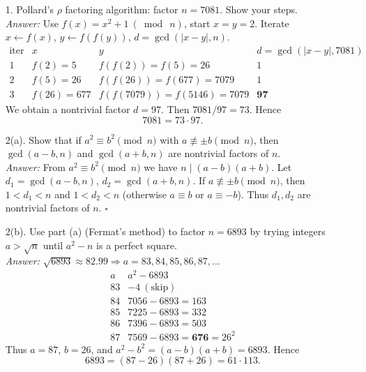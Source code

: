 \documentclass{article}
\begin{document}
\begin{itemize}
    \item[1.] Pollard’s $\rho$ factoring algorithm: factor \(n=7081\). Show your steps.
    \medskip\\
    \textit{Answer:} Use \(f(x)=x^2+1\ (\bmod\ n)\), start \(x=y=2\). Iterate \(x\gets f(x)\), \(y\gets f(f(y))\), \(d=\gcd(|x-y|,n)\).
    \[
    \begin{array}{c|c|c|c}
      \text{iter} & x & y & d=\gcd(|x-y|,7081)\\ \hline
      1 & f(2)=5   & f(f(2))=f(5)=26 & 1\\
      2 & f(5)=26  & f(f(26))=f(677)=7079 & 1\\
      3 & f(26)=677& f(f(7079))=f(5146)=7079 & \mathbf{97}
    \end{array}
    \]
    We obtain a nontrivial factor \(d=97\). Then \(7081/97=73\). Hence
    \[
      \boxed{7081=73\cdot 97}.
    \]

    \medskip

    \item[2(a).] Show that if \(a^2\equiv b^2\pmod n\) with \(a\not\equiv \pm b\pmod n\), then \(\gcd(a-b,n)\) and \(\gcd(a+b,n)\) are nontrivial factors of \(n\).
    \medskip\\
    \textit{Answer:} From \(a^2\equiv b^2\pmod n\) we have \(n\mid (a-b)(a+b)\). Let \(d_1=\gcd(a-b,n)\), \(d_2=\gcd(a+b,n)\). If \(a\not\equiv \pm b\pmod n\), then \(1<d_1<n\) and \(1<d_2<n\) (otherwise \(a\equiv b\) or \(a\equiv -b\)). Thus \(d_1,d_2\) are nontrivial factors of \(n\). \hfill$\square$

    \medskip

    \item[2(b).] Use part (a) (Fermat’s method) to factor \(n=6893\) by trying integers \(a>\sqrt{n}\) until \(a^2-n\) is a perfect square.
    \medskip\\
    \textit{Answer:} \(\sqrt{6893}\approx 82.99\Rightarrow a=83,84,85,86,87,\dots\)
    \[
      \begin{array}{c|c}
        a & a^2-6893 \\ \hline
        83 & -4\ (\text{skip})\\
        84 & 7056-6893=163\\
        85 & 7225-6893=332\\
        86 & 7396-6893=503\\
        87 & 7569-6893=\mathbf{676}=26^2
      \end{array}
    \]
    Thus \(a=87\), \(b=26\), and \(a^2-b^2=(a-b)(a+b)=6893\). Hence
    \[
      \boxed{6893=(87-26)(87+26)=61\cdot 113}.
    \]
\end{itemize}
\end{document}
